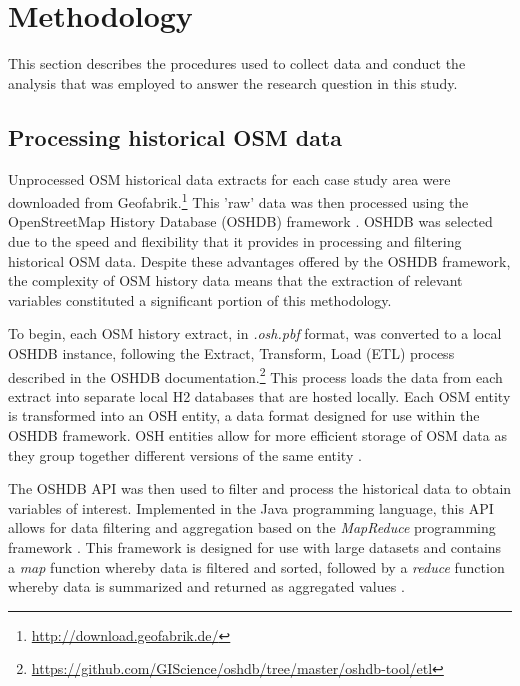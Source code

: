 \chapter{Methodology}
\label{chapterlabel4}

This section describes the procedures used to collect data and conduct the analysis that was employed to answer the research question in this study. 

\section{Processing historical OSM data}

Unprocessed OSM historical data extracts for each case study area were downloaded from Geofabrik.\footnote{\url{http://download.geofabrik.de/}} This 'raw' data was then processed using the OpenStreetMap History Database (OSHDB) framework \parencite{raifer_oshdb_2019}. OSHDB was selected due to the speed and flexibility that it provides in processing and filtering historical OSM data. Despite these advantages offered by the OSHDB framework, the complexity of OSM history data means that the extraction of relevant variables constituted a significant portion of this methodology. 

To begin, each OSM history extract, in \textit{.osh.pbf} format, was converted to a local OSHDB instance, following the Extract, Transform, Load (ETL) process described in the OSHDB documentation.\footnote{\url{https://github.com/GIScience/oshdb/tree/master/oshdb-tool/etl}} This process loads the data from each extract into separate local H2 databases that are hosted locally. Each OSM entity is transformed into an OSH entity, a data format designed for use within the OSHDB framework. OSH entities allow for more efficient storage of OSM data as they group together different versions of the same entity \parencite{raifer_oshdb_2019}. 

The OSHDB API \parencite{raifer_oshdb_2019} was then used to filter and process the historical data to obtain variables of interest.  Implemented in the Java programming language, this API allows for data filtering and aggregation based on the \textit{MapReduce} programming framework \parencite{raifer_oshdb_2019}. This framework is designed for use with large datasets and contains a \textit{map} function whereby data is filtered and sorted, followed by a \textit{reduce} function whereby data is summarized and returned as aggregated values \parencite{dean_mapreduce_2008}. 

